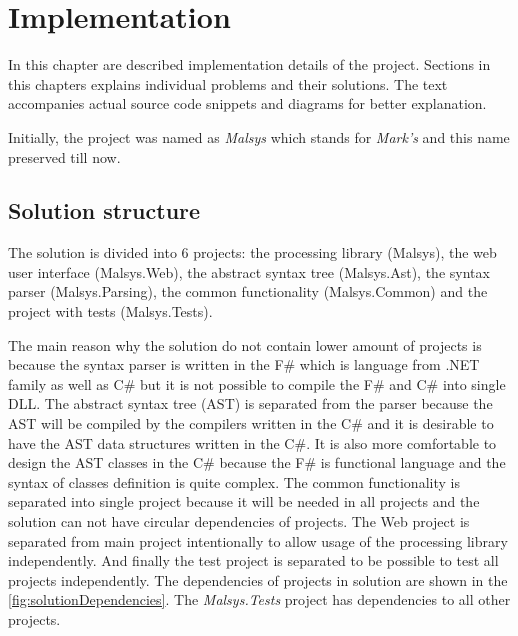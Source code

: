 
\chapter{Implementation}
\label{chap:implementation}

In this chapter are described implementation details of the project.
Sections in this chapters explains individual problems and their solutions.
The text accompanies actual source code snippets and diagrams for better explanation.


Initially, the project was named as \emph{Malsys} which stands for \emph{Mark's \lsystems} and this name preserved till now.


\section{Solution structure}

The solution is divided into 6 projects: the \lsystem processing library (Malsys), the web user interface (Malsys.Web), the abstract syntax tree (Malsys.Ast), the syntax parser (Malsys.Parsing), the common functionality (Malsys.Common) and the project with tests (Malsys.Tests).

The main reason why the solution do not contain lower amount of projects is because the syntax parser is written in the F\# which is language from .NET family as well as C\# but it is not possible to compile the F\# and C\# into single DLL.
The abstract syntax tree (AST) is separated from the parser because the AST will be compiled by the compilers written in the C\# and it is desirable to have the AST data structures written in the C\#.
It is also more comfortable to design the AST classes in the C\# because the F\# is functional language and the syntax of classes definition is quite complex.
The common functionality is separated into single project because it will be needed in all projects and the solution can not have circular dependencies of projects.
The Web project is separated from main project intentionally to allow usage of the \lsystem processing library independently.
And finally the test project is separated to be possible to test all projects independently.
The dependencies of projects in solution are shown in the \autoref{fig:solutionDependencies}.
The \emph{Malsys.Tests} project has dependencies to all other projects.

